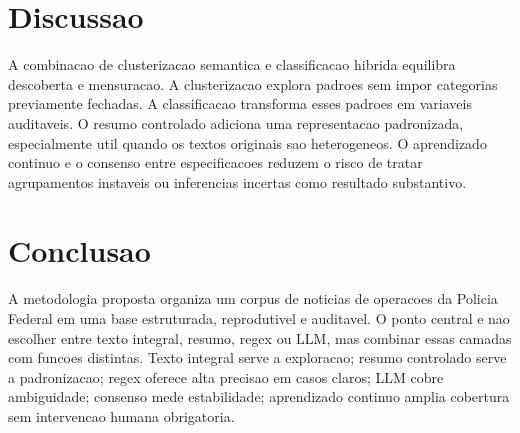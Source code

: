 \documentclass[12pt]{article}
\begin{document}
\section{Discussao}

A combinacao de clusterizacao semantica e classificacao hibrida equilibra descoberta e mensuracao. A clusterizacao explora padroes sem impor categorias previamente fechadas. A classificacao transforma esses padroes em variaveis auditaveis. O resumo controlado adiciona uma representacao padronizada, especialmente util quando os textos originais sao heterogeneos. O aprendizado continuo e o consenso entre especificacoes reduzem o risco de tratar agrupamentos instaveis ou inferencias incertas como resultado substantivo.

\section{Conclusao}

A metodologia proposta organiza um corpus de noticias de operacoes da Policia Federal em uma base estruturada, reprodutivel e auditavel. O ponto central e nao escolher entre texto integral, resumo, regex ou LLM, mas combinar essas camadas com funcoes distintas. Texto integral serve a exploracao; resumo controlado serve a padronizacao; regex oferece alta precisao em casos claros; LLM cobre ambiguidade; consenso mede estabilidade; aprendizado continuo amplia cobertura sem intervencao humana obrigatoria.



\end{document}
